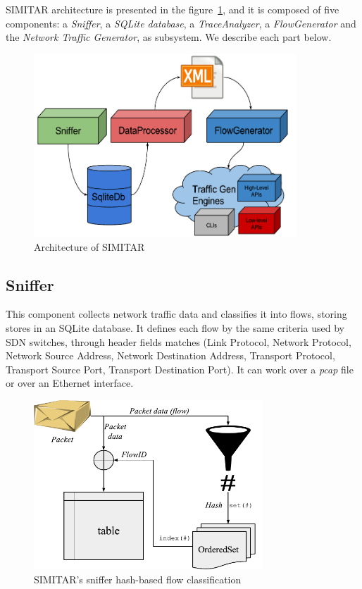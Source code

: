 SIMITAR architecture is presented in the figure~\ref{fig:architecture}, and it is composed of five components: a \textit{Sniffer}, a \textit{SQLite database}, a \textit{TraceAnalyzer}, a \textit{FlowGenerator} and the \textit{Network Traffic Generator}, as subsystem. We describe each part below.

\begin{figure}[ht!]
        \centering
        \includegraphics[height=2.7in]{figures/ch3/architecture-diagram}
        \caption{Architecture of SIMITAR}
    \label{fig:architecture}
\end{figure}



\subsection{Sniffer}

This component collects network traffic data and classifies it into flows, storing stores in an SQLite database. It defines each flow by the same criteria used by SDN switches\cite{sdn-survey}, through header fields matches (Link Protocol, Network Protocol, Network Source Address, Network Destination Address, Transport Protocol, Transport Source Port, Transport Destination Port). It can work over a \textit{pcap} file or over an Ethernet interface. 

\begin{figure}[ht!]
        \centering
        \includegraphics[height=2.5in]{figures/ch3/sniffer-classifier}
        \caption{SIMITAR's sniffer hash-based flow classification}
    \label{fig:sniffer}
\end{figure}

